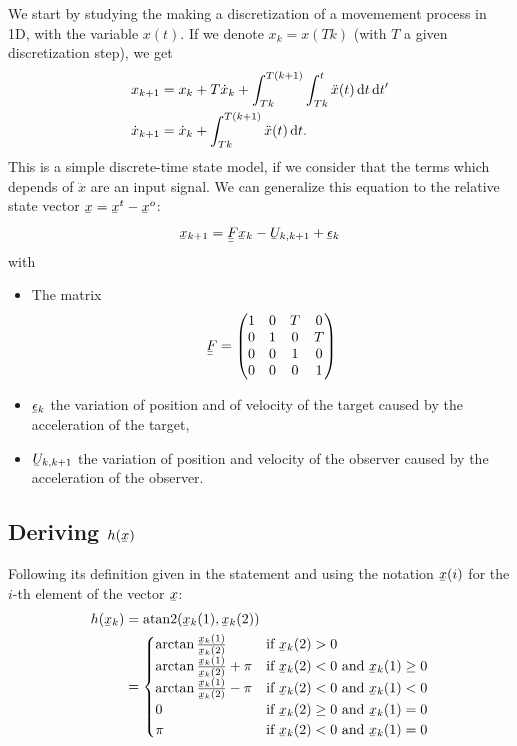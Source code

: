 \documentclass[english,DIV=13]{scrartcl}
\newcommand{\ubar}[1]{\underaccent{\bar}{#1}}
\newcommand{\uvec}[1]{\ubar{#1}}
\newcommand{\umatrix}[1]{\ubar{\ubar{#1}}}
\begin{document}
We start by studying the making a discretization of a movemement process in 1D, with the
variable $x(t)$. If we denote $x_k = x(Tk)$ (with $T$ a given discretization step), we
get
\begin{align*}
    x_{k+1} &= x_k + T\dot{x}_k + \int_{Tk}^{T(k+1)}\int_{Tk}^{t}\ddot{x}(t)\operatorname{d}\! t\operatorname{d}\! t' \\
    \dot{x}_{k+1} &=  \dot{x}_k + \int_{Tk}^{T(k+1)}\ddot{x}(t)\operatorname{d}\! t.
\end{align*}
This is a simple discrete-time state model, if we consider that the terms which depends of $\ddot{x}$
are an input signal.
We can generalize this equation to the relative state vector $\uvec{x} = \uvec{x}^t - \uvec{x}^o$:
\[\uvec{x}_{k+1} = \umatrix{F}\uvec{x}_k - \uvec{U}_{k,k+1} + \uvec{\epsilon}_k\]
with
\begin{itemize}
    \item The matrix
        \[\umatrix{F} =
        \begin{pmatrix}
            1 & 0 & T & 0 \\
            0 & 1 & 0 & T \\   
            0 & 0 & 1 & 0 \\
            0 & 0 & 0 & 1   
        \end{pmatrix}
        \]
    \item $\uvec{\epsilon}_k$ the variation of position and of velocity of the target caused by the
acceleration of the target,
    \item $\uvec{U}_{k,k+1}$ the variation of position and velocity of
the observer caused by the acceleration of the observer.
\end{itemize}

\subsection*{Deriving $h(\ubar{x})$}
Following its definition given in the statement and using the notation $\uvec{x}(i)$
for the $i$-th element of the vector $\uvec{x}$:
\begin{align*}
    h(\uvec{x}_k) &= \mathrm{atan2}(\uvec{x}_k(1), \uvec{x}_k(2)) \\
    &= \begin{cases}
        \arctan\frac{\uvec{x}_k(1)}{\uvec{x}_k(2)} & \text{if $\uvec{x}_k(2) > 0$} \\
        \arctan\frac{\uvec{x}_k(1)}{\uvec{x}_k(2)}+\pi & \text{if $\uvec{x}_k(2) < 0$ and $\uvec{x}_k(1) \geq 0$} \\
        \arctan\frac{\uvec{x}_k(1)}{\uvec{x}_k(2)}-\pi & \text{if $\uvec{x}_k(2) < 0$ and $\uvec{x}_k(1) < 0$} \\
        0 & \text{if $\uvec{x}_k(2) \geq 0$ and $\uvec{x}_k(1) = 0$} \\
        \pi & \text{if $\uvec{x}_k(2) < 0$ and $\uvec{x}_k(1) = 0$}
    \end{cases}
\end{align*}
\end{document}
